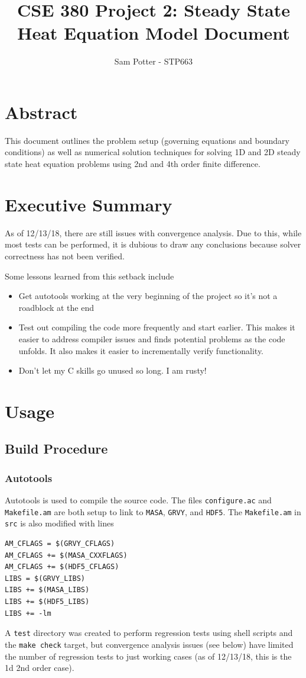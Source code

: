 \documentclass[letterpaper,12pt]{article}
\title{CSE 380 Project 2: Steady State Heat Equation Model Document}
\author{Sam Potter - STP663}
\begin{document}
\maketitle

\tableofcontents

\section{Abstract}
This document outlines the problem setup (governing equations and boundary conditions) as well as numerical solution techniques for solving 1D and 2D steady state heat equation problems using 2nd and 4th order finite difference.

\section{Executive Summary}
As of 12/13/18, there are still issues with convergence analysis. Due to this, while most tests can be performed, it is dubious to draw any conclusions because solver correctness has not been verified.

Some lessons learned from this setback include
\begin{itemize}
\item Get autotools working at the very beginning of the project so it's not a roadblock at the end
\item Test out compiling the code more frequently and start earlier. This makes it easier to address compiler issues and finds potential problems as the code unfolds. It also makes it easier to incrementally verify functionality.
\item Don't let my C skills go unused so long. I am rusty!
\end{itemize}

\section{Usage}
\subsection{Build Procedure}
\subsubsection{Autotools}
Autotools is used to compile the source code. The files \verb|configure.ac| and \verb|Makefile.am| are both setup to link to \verb|MASA|, \verb|GRVY|, and \verb|HDF5|. The \verb|Makefile.am| in \verb|src| is also modified with lines
\begin{verbatim}
AM_CFLAGS = $(GRVY_CFLAGS)
AM_CFLAGS += $(MASA_CXXFLAGS)
AM_CFLAGS += $(HDF5_CFLAGS)
LIBS = $(GRVY_LIBS)
LIBS += $(MASA_LIBS)
LIBS += $(HDF5_LIBS)
LIBS += -lm
\end{verbatim}
A \verb|test| directory was created to perform regression tests using shell scripts and the \verb|make check| target, but convergence analysis issues (see below) have limited the number of regression tests to just working cases (as of 12/13/18, this is the 1d 2nd order case).
\end{document}
